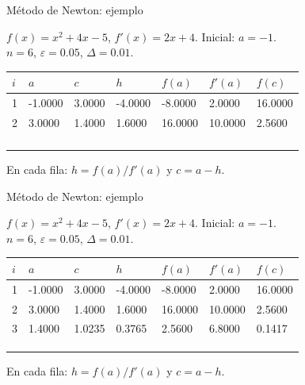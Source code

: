 \documentclass[main.tex]{subfiles}
\begin{document}
\begin{frame}[t]{Método de Newton: ejemplo}
\begin{minipage}[t][17mm]{\textwidth}\small
$f(x)=x^2+4x-5$, $f'(x)=2x+4$. Inicial: $a=-1$.\\
$n=6$, $\varepsilon=0.05$, $\Delta=0.01$.
\end{minipage}\begingroup\scriptsize\setlength{\tabcolsep}{2pt}
\begin{center}\begin{tabular}{|C{.04\textwidth}|*{6}{C{.135\textwidth}|}}\hline
$i$&$a$&$c$&$h$&$f(a)$&$f'(a)$&$f(c)$\\\hline
\rule{0pt}{5mm}1&-1.0000&3.0000&-4.0000&-8.0000&2.0000&16.0000\\\hline
\rule{0pt}{5mm}2&3.0000&1.4000&1.6000&16.0000&10.0000&2.5600\\\hline
\rule{0pt}{5mm}&&&&&&\\\hline
\rule{0pt}{5mm}&&&&&&\\\hline
\rule{0pt}{5mm}&&&&&&\\\hline
\rule{0pt}{5mm}&&&&&&\\\hline
\end{tabular}\end{center}\endgroup\small En cada fila: $h=f(a)/f\prime(a)$ y $c=a-h$.
\end{frame}
\begin{frame}[t]{Método de Newton: ejemplo}
\begin{minipage}[t][17mm]{\textwidth}\small
$f(x)=x^2+4x-5$, $f'(x)=2x+4$. Inicial: $a=-1$.\\
$n=6$, $\varepsilon=0.05$, $\Delta=0.01$.
\end{minipage}\begingroup\scriptsize\setlength{\tabcolsep}{2pt}
\begin{center}\begin{tabular}{|C{.04\textwidth}|*{6}{C{.135\textwidth}|}}\hline
$i$&$a$&$c$&$h$&$f(a)$&$f'(a)$&$f(c)$\\\hline
\rule{0pt}{5mm}1&-1.0000&3.0000&-4.0000&-8.0000&2.0000&16.0000\\\hline
\rule{0pt}{5mm}2&3.0000&1.4000&1.6000&16.0000&10.0000&2.5600\\\hline
\rule{0pt}{5mm}3&1.4000&1.0235&0.3765&2.5600&6.8000&0.1417\\\hline
\rule{0pt}{5mm}&&&&&&\\\hline
\rule{0pt}{5mm}&&&&&&\\\hline
\rule{0pt}{5mm}&&&&&&\\\hline
\end{tabular}\end{center}\endgroup\small En cada fila: $h=f(a)/f\prime(a)$ y $c=a-h$.
\end{frame}
\end{document}
